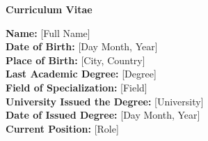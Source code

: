 \cleardoublepage
\thispagestyle{empty}

\begin{center}\huge \textbf{Curriculum Vitae}\end{center}

\vspace{2em}
\begin{flushleft}
\textbf{Name:} [Full Name]\\
\textbf{Date of Birth:} [Day Month, Year]\\
\textbf{Place of Birth:} [City, Country]\\
\textbf{Last Academic Degree:} [Degree]\\
\textbf{Field of Specialization:} [Field]\\
\textbf{University Issued the Degree:} [University]\\
\textbf{Date of Issued Degree:} [Day Month, Year]\\
\textbf{Current Position:} [Role]\\
\end{flushleft}
